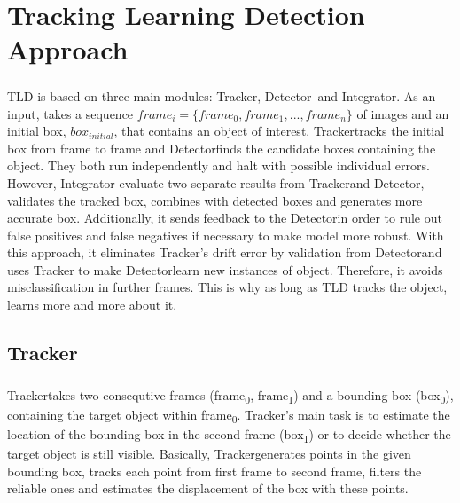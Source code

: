 \documentclass{report}
\newcommand{\Tracker}{Tracker}
\newcommand{\Detector}{Detector}
\newcommand{\Integrator}{Integrator}
\newcommand{\initialbox}{$ box_{initial} $}
\begin{document}

    \chapter{Tracking Learning Detection Approach}
    \paragraph{}
        TLD is based on three main modules: \Tracker, \Detector\ and \Integrator.
        As an input, takes a sequence $ frame_{i} = \{ frame_{0}, frame_{1}, ..., frame_{n} \}$ of images
        and an initial box, \initialbox, that contains an object of interest.
        \Tracker tracks the initial box from frame to frame and \Detector finds the candidate boxes containing the object.
        They both run independently and halt with possible individual errors. However, Integrator
        evaluate two separate results from \Tracker and \Detector, validates the tracked box, combines with detected boxes
        and generates more accurate box.
        Additionally, it sends feedback to the \Detector in order to rule out false positives and false negatives
        if necessary to make model more robust.
        With this approach, it eliminates \Tracker's drift error by validation from \Detector and uses \Tracker
        to make \Detector learn new instances of object. Therefore, it avoids misclassification in further frames.
        This is why as long as TLD tracks the object, learns more and more about it.
    \section{Tracker}
        \paragraph{}
            \Tracker takes two consequtive frames (frame\textsubscript{0}, frame\textsubscript{1})
            and a bounding box (box\textsubscript{0}), containing the target object within frame\textsubscript{0}.
            \Tracker's main task is to estimate the location of the bounding box in the second frame (box\textsubscript{1})
            or to decide whether the target object is still visible. Basically, \Tracker generates points in the given
            bounding box, tracks each point from first frame to second frame, filters the reliable ones and estimates
            the displacement of the box with these points.
\end{document}
